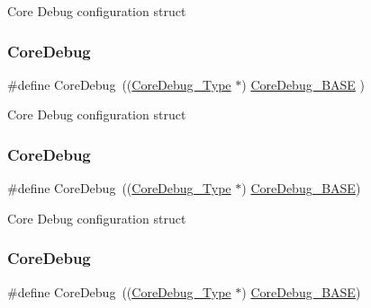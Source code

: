 Core Debug configuration struct \mbox{\label{group___c_m_s_i_s__core__base_gab6e30a2b802d9021619dbb0be7f5d63d}} 
\subsubsection{\texorpdfstring{Core\+Debug}{CoreDebug}\hspace{0.1cm}{\footnotesize\ttfamily [2/8]}}
{\footnotesize\ttfamily \#define Core\+Debug~((\hyperlink{struct_core_debug___type}{Core\+Debug\+\_\+\+Type} $\ast$)     \hyperlink{group___c_m_s_i_s__core__base_ga680604dbcda9e9b31a1639fcffe5230b}{Core\+Debug\+\_\+\+B\+A\+SE}   )}

Core Debug configuration struct \mbox{\label{group___c_m_s_i_s__core__base_gab6e30a2b802d9021619dbb0be7f5d63d}} 
\subsubsection{\texorpdfstring{Core\+Debug}{CoreDebug}\hspace{0.1cm}{\footnotesize\ttfamily [3/8]}}
{\footnotesize\ttfamily \#define Core\+Debug~((\hyperlink{struct_core_debug___type}{Core\+Debug\+\_\+\+Type} $\ast$)     \hyperlink{group___c_m_s_i_s__core__base_ga680604dbcda9e9b31a1639fcffe5230b}{Core\+Debug\+\_\+\+B\+A\+SE})}

Core Debug configuration struct \mbox{\label{group___c_m_s_i_s__core__base_gab6e30a2b802d9021619dbb0be7f5d63d}} 
\subsubsection{\texorpdfstring{Core\+Debug}{CoreDebug}\hspace{0.1cm}{\footnotesize\ttfamily [4/8]}}
{\footnotesize\ttfamily \#define Core\+Debug~((\hyperlink{struct_core_debug___type}{Core\+Debug\+\_\+\+Type} $\ast$)     \hyperlink{group___c_m_s_i_s__core__base_ga680604dbcda9e9b31a1639fcffe5230b}{Core\+Debug\+\_\+\+B\+A\+SE})}

